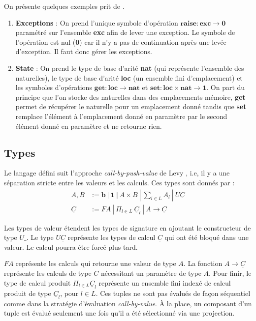 	\begin{exemple}\label{exStateExc}
		On présente quelques exemples prit de \cite{DBLP:journals/tcs/HylandPP06}.
		\begin{enumerate}
			\item[]\textbf{Exceptions} : On prend l'unique symbole d'opération $\textbf{raise} : \textbf{exc} \rightarrow \textbf{0}$ paramétré sur l'ensemble \textbf{exc} afin de lever une exception. Le symbole de l'opération est nul (\textbf{0}) car il n'y a pas de continuation après une levée d'exception. Il faut donc gérer les exceptions.
			
			\item[]\textbf{State} : On prend le type de base d'arité \textbf{nat} (qui représente l'ensemble des naturelles), le type de base d'arité \textbf{loc} (un ensemble fini d'emplacement) et les symboles d'opérations $\textbf{get} : \textbf{loc} \rightarrow \textbf{nat}$ et $\textbf{set} : \textbf{loc} \times \textbf{nat} \rightarrow \textbf{1}$. On part du principe que l'on stocke des naturelles dans des emplacements mémoire, \textbf{get} permet de récupérer le naturelle pour un emplacement donné tandis que \textbf{set} remplace l'élément à l'emplacement donné en paramètre par le second élément donné en paramètre et ne retourne rien. 
		\end{enumerate}
	\end{exemple}

\subsection{Types}
	
	Le langage défini suit l'approche \textit{call-by-push-value} de Levy \cite{DBLP:journals/lisp/Levy06}, i.e, il y a une séparation stricte entre les valeurs et les calculs. Ces types sont donnés par : 
	\begin{align*}
		A,B &:= \textbf{b}~|~\textbf{1}~|~A \times B~|~\sum_{l \in L} A_l~|~U\underline{C}\\
		\underline{C} &:= FA~|~\Pi_{l\in L}~\underline{C}_l~|~A \rightarrow\underline{C}
	\end{align*}
	
	Les types de valeur étendent les types de signature en ajoutant le constructeur de type $U\_$. Le type $U\underline{C}$ représente les types de calcul $\underline{C}$ qui ont été bloqué dans une valeur. Le calcul pourra être forcé plus tard.
	
	$FA$ représente les calculs qui retourne une valeur de type $A$. La fonction $A \rightarrow \underline{C}$ représente les calculs de type $\underline{C}$ nécessitant un paramètre de type $A$. Pour finir, le type de calcul produit $\Pi_{l\in L} \underline{C}_l$ représente un ensemble fini indexé de calcul produit de type $\underline{C}_l$, pour $l \in L$. Ces tuples ne sont pas évalués de façon séquentiel comme dans la stratégie d'évaluation \textit{call-by-value}. À la place, un composant d'un tuple est évalué seulement une fois qu'il a été sélectionné via une projection. 
	
